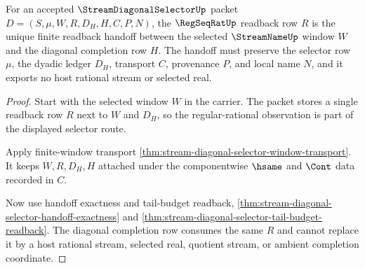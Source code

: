 \begin{theorem}
\label{thm:stream-diagonal-selector-regseqrat-handoff}
For an accepted $\StreamDiagonalSelectorUp$ packet $D=(S,\mu,W,R,D_H,H,C,P,N)$, the $\RegSeqRatUp$ readback row $R$ is the unique finite readback handoff between the selected $\StreamNameUp$ window $W$ and the diagonal completion row $H$. The handoff must preserve the selector row $\mu$, the dyadic ledger $D_H$, transport $C$, provenance $P$, and local name $N$, and it exports no host rational stream or selected real.
\end{theorem}
\begin{proof}
Start with the selected window $W$ in the carrier. The packet stores a single readback row $R$ next to $W$ and $D_H$, so the regular-rational observation is part of the displayed selector route.

Apply finite-window transport \autoref{thm:stream-diagonal-selector-window-transport}. It keeps $W,R,D_H,H$ attached under the componentwise $\hsame$ and $\Cont$ data recorded in $C$.

Now use handoff exactness and tail-budget readback, \autoref{thm:stream-diagonal-selector-handoff-exactness} and \autoref{thm:stream-diagonal-selector-tail-budget-readback}. The diagonal completion row consumes the same $R$ and cannot replace it by a host rational stream, selected real, quotient stream, or ambient completion coordinate.
\end{proof}

